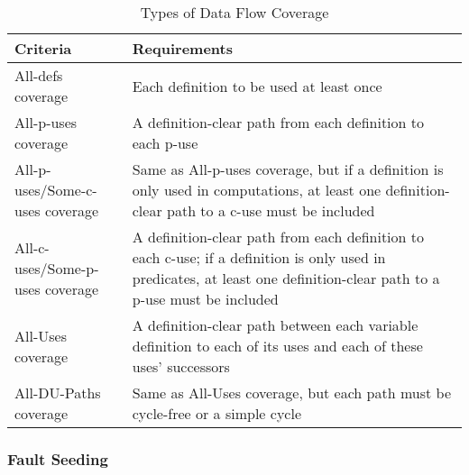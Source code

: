 \begin{table}[hbtp!]
      \centering
      \caption{Types of Data Flow Coverage}
      \label{table:data-flow-coverage-types}
      \begin{tabularx}{\textwidth}{|>{\hsize=0.65\hsize}X|>{\hsize=1.35\hsize}X|}
            \hline
            \rowcolor{McMasterMediumGrey}
            \textbf{Criteria}         & \textbf{Requirements}                \\
            \hline
            All-defs coverage         & Each definition to be used at least
            once                                                             \\
            All-\acsp{p-use} coverage & A definition-clear path from each
            definition to each \acs{p-use}                                   \\
            All-\acsp{p-use}/Some-\acsp{c-use}
            coverage                  & Same as All-\acsp{p-use} coverage,
            but if a definition is only used in computations, at least one
            definition-clear path to a \acs{c-use} must be included          \\
            All-\acsp{c-use}/Some-\acsp{p-use}
            coverage                  & A definition-clear path from each
            definition to each \acs{c-use}; if a definition is only used
            in predicates, at least one definition-clear path to a
            \acs{p-use} must be included                                     \\
            All-Uses coverage         & A definition-clear path between each
            variable definition to each of its uses and each of these uses'
            successors                                                       \\
            All-DU-Paths coverage     & Same as All-Uses coverage, but each
            path must be cycle-free or a simple cycle                        \\
            \hline
      \end{tabularx}
\end{table}


\subsubsection{Fault Seeding \cite[pp.~427-428]{van_vliet_software_2000}}

